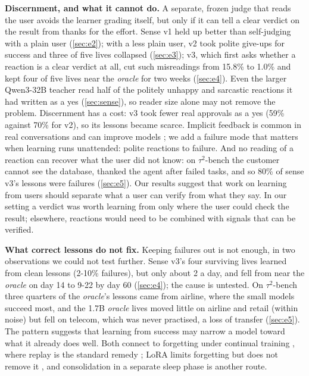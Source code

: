 \textbf{Discernment, and what it cannot do.} A separate, frozen judge that reads the user avoids the learner grading itself, but only if it can tell a clear verdict on the result from thanks for the effort. Sense v1 held up better than self-judging with a plain user (\ref{sec:e2}); with a less plain user, v2 took polite give-ups for success and three of five lives collapsed (\ref{sec:e3}); v3, which first asks whether a reaction is a clear verdict at all, cut such misreadings from 15.8\% to 1.0\% and kept four of five lives near the \emph{oracle} for two weeks (\ref{sec:e4}). Even the larger Qwen3-32B teacher read half of the politely unhappy and sarcastic reactions it had written as a yes (\ref{sec:sense}), so reader size alone may not remove the problem. Discernment has a cost: v3 took fewer real approvals as a yes (59\% against 70\% for v2), so its lessons became scarce. Implicit feedback is common in real conversations and can improve models \cite{kreutzer2018can, doneyehiya2024naturally, shi2026wildfeedback, hancock2019learning, chen2025retrospective}; we add a failure mode that matters when learning runs unattended: polite reactions to failure. And no reading of a reaction can recover what the user did not know: on $\tau^2$-bench the customer cannot see the database, thanked the agent after failed tasks, and so 80\% of sense v3's lessons were failures (\ref{sec:e5}). Our results suggest that work on learning from users should separate what a user can verify from what they say. In our setting a verdict was worth learning from only where the user could check the result; elsewhere, reactions would need to be combined with signals that can be verified.

\textbf{What correct lessons do not fix.} Keeping failures out is not enough, in two observations we could not test further. Sense v3's four surviving lives learned from clean lessons (2-10\% failures), but only about 2 a day, and fell from near the \emph{oracle} on day 14 to 9-22 by day 60 (\ref{sec:e4}); the cause is untested. On $\tau^2$-bench three quarters of the \emph{oracle}'s lessons came from airline, where the small models succeed most, and the 1.7B \emph{oracle} lives moved little on airline and retail (within noise) but fell on telecom, which was never practised, a loss of transfer (\ref{sec:e5}). The pattern suggests that learning from success may narrow a model toward what it already does well. Both connect to forgetting under continual training \cite{mccloskey1989catastrophic, delange2022continual, luo2025empirical}, where replay is the standard remedy \cite{rolnick2019experience}; LoRA limits forgetting but does not remove it \cite{biderman2024lora}, and consolidation in a separate sleep phase \cite{mcclelland1995why, behrouz2026language} is another route.
